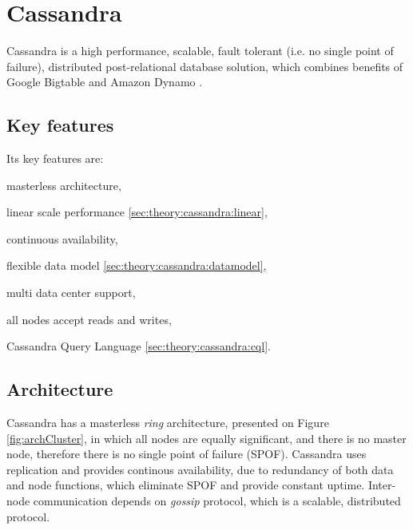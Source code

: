
\section{Cassandra}
\label{sec:theory:cassandra}
Cassandra \cite{CassandraApacheDocs} \cite{CassandraDataStaxDocs} \cite{lakshman2010cassandra} is a high performance, scalable, fault tolerant (i.e. no single point of failure), distributed post-relational database solution, which combines benefits of Google Bigtable \cite{chang2008bigtable} and Amazon Dynamo \cite{decandia2007dynamo}.


\subsection{Key features}
Its key features are:
\begin{enumerate*}[label=(\alph*)]
\item masterless architecture,
\item linear scale performance \ref{sec:theory:cassandra:linear},
\item continuous availability,
\item flexible data model \ref{sec:theory:cassandra:datamodel},
\item multi data center support,
\item all nodes accept reads and writes,
\item Cassandra Query Language \ref{sec:theory:cassandra:cql}.
\end{enumerate*}

\subsection{Architecture}
Cassandra has a masterless \emph{ring} architecture, presented on Figure \ref{fig:archCluster}, in which all nodes are equally significant, and there is no master node, therefore there is no single point of failure (SPOF). Cassandra uses replication and provides continous availability, due to redundancy of both data and node functions, which eliminate SPOF and provide constant uptime.
Inter-node communication depends on \emph{gossip} protocol, which is a scalable, distributed protocol.

